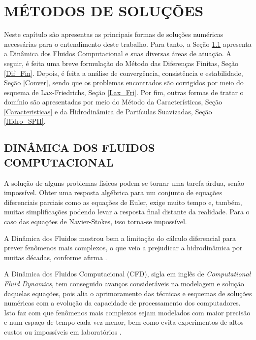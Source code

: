 \chapter{MÉTODOS DE SOLUÇÕES}

Neste capítulo são apresentas as principais formas de soluções numéricas necessárias para o entendimento deste trabalho. Para tanto, a Seção \ref{Dinâmica} apresenta a Dinâmica dos Fluidos Computacional e suas diversas áreas de atuação. A seguir, é feita uma breve formulação do Método das Diferenças Finitas, Seção \ref{Dif_Fin}. Depois, é feita a análise de convergência, consistência e estabilidade, Seção \ref{Conver}, sendo que os problemas encontrados são corrigidos por meio do esquema de Lax-Friedrichs, Seção \ref{Lax_Fri}. Por fim, outras formas de tratar o domínio são apresentadas por meio do Método da Características, Seção \ref{Caracteristicas} e da Hidrodinâmica de Partículas Suavizadas, Seção \ref{Hidro_SPH}.

\section{DINÂMICA DOS FLUIDOS COMPUTACIONAL} \label{Dinâmica}

A solução de alguns problemas físicos podem se tornar uma tarefa árdua, senão impossível. Obter uma resposta algébrica para um conjunto de equações diferenciais parciais como as equações de Euler, exige muito tempo e, também, muitas simplificações podendo levar a resposta final distante da realidade. Para o caso das equações de Navier-Stokes, isso torna-se impossível.

A Dinâmica dos Fluidos mostrou bem a limitação do cálculo diferencial para prever fenômenos mais complexos, o que veio a prejudicar a hidrodinâmica por muitas décadas, conforme afirma . 

A Dinâmica dos Fluidos Computacional (CFD), sigla em inglês de \textit{Computational Fluid Dynamics}, tem conseguido avanços consideráveis na modelagem e solução daquelas equações, pois alia o aprimoramento das técnicas e esquemas de soluções numéricas com a evolução da capacidade de processamento dos computadores. Isto faz com que fenômenos mais complexos sejam modelados com maior precisão e num espaço de tempo cada vez menor, bem como evita experimentos de altos custos ou impossíveis em laboratórios \cite{Crespo}.

